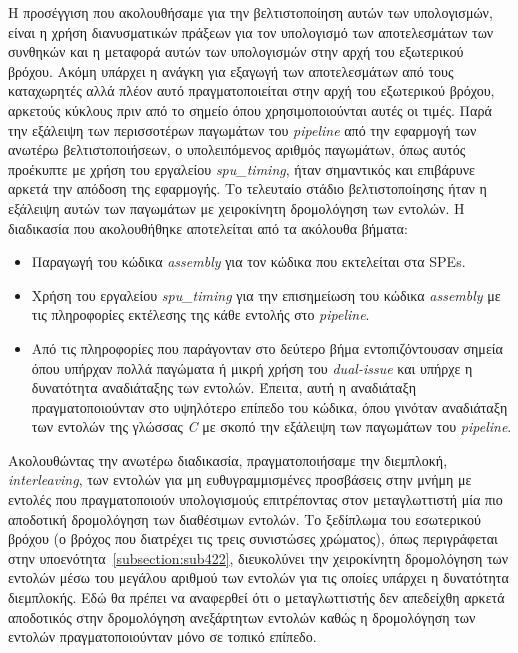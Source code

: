 Η προσέγγιση που ακολουθήσαμε για την βελτιστοποίηση αυτών των υπολογισμών, είναι η χρήση διανυσματικών πράξεων για τον υπολογισμό των αποτελεσμάτων των συνθηκών και η μεταφορά αυτών των υπολογισμών στην αρχή του εξωτερικού βρόχου. Ακόμη υπάρχει η ανάγκη για εξαγωγή των αποτελεσμάτων από τους καταχωρητές αλλά πλέον αυτό πραγματοποιείται στην αρχή του εξωτερικού βρόχου, αρκετούς κύκλους πριν από το σημείο όπου χρησιμοποιούνται αυτές οι τιμές.\newline \indent
Παρά την εξάλειψη των περισσοτέρων παγωμάτων του \textsl{pipeline} από την εφαρμογή των ανωτέρω βελτιστοποιήσεων, ο υπολειπόμενος αριθμός παγωμάτων, όπως αυτός προέκυπτε με χρήση του εργαλείου \textsl{spu\_timing}, ήταν σημαντικός και επιβάρυνε αρκετά την απόδοση της εφαρμογής. Το τελευταίο στάδιο βελτιστοποίησης ήταν η εξάλειψη αυτών των παγωμάτων με χειροκίνητη δρομολόγηση των εντολών. Η διαδικασία που ακολουθήθηκε αποτελείται από τα ακόλουθα βήματα:
\begin{itemize}

\item{Παραγωγή του κώδικα \textsl{assembly} για τον κώδικα που εκτελείται στα \acp{SPE}.}

\item{Χρήση του εργαλείου \textsl{spu\_timing} για την επισημείωση του κώδικα \textsl{assembly} με τις πληροφορίες εκτέλεσης της κάθε εντολής στο \textsl{pipeline}.}

\item{Από τις πληροφορίες που παράγονταν στο δεύτερο βήμα εντοπιζόντουσαν σημεία όπου υπήρχαν πολλά παγώματα ή μικρή χρήση του \textsl{dual-issue} και υπήρχε η δυνατότητα αναδιάταξης των εντολών. Έπειτα, αυτή η αναδιάταξη πραγματοποιούνταν στο υψηλότερο επίπεδο του κώδικα, όπου γινόταν αναδιάταξη των εντολών της γλώσσας \textsl{C} με σκοπό την εξάλειψη των παγωμάτων του \textsl{pipeline}.}
\end{itemize}
\indent Ακολουθώντας την ανωτέρω διαδικασία, πραγματοποιήσαμε την διεμπλοκή, \textsl{interleaving}, των εντολών για μη ευθυγραμμισμένες προσβάσεις στην μνήμη με εντολές που πραγματοποιούν υπολογισμούς επιτρέποντας στον μεταγλωττιστή μία πιο αποδοτική δρομολόγηση των διαθέσιμων εντολών. Το ξεδίπλωμα του εσωτερικού βρόχου (ο βρόχος που διατρέχει τις τρεις συνιστώσες χρώματος), όπως περιγράφεται στην υποενότητα~\ref{subsection:sub422}, διευκολύνει την χειροκίνητη δρομολόγηση των εντολών μέσω του μεγάλου αριθμού των εντολών για τις οποίες υπάρχει η δυνατότητα διεμπλοκής. Εδώ θα πρέπει να αναφερθεί ότι ο μεταγλωττιστής δεν απεδείχθη αρκετά αποδοτικός στην δρομολόγηση ανεξάρτητων εντολών καθώς η δρομολόγηση των εντολών πραγματοποιούνταν μόνο σε τοπικό επίπεδο.\newline \indent
